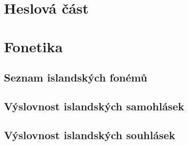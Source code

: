 \fi



\chapter{Heslová část}




\ifinputletters

\cleardoublepage

\dictionarygeometry
\pagestyle{myheadings}



\restoregeometry
\pagestyle{plain}

\fi



\ifinputphon

\cleardoublepage

\chapter{Fonetika}                               \label{sec:phon}

\section{Seznam islandských fonémů}              \label{sec:phon_phonems}
\clearpage

\section{Výslovnost islandských samohlásek}      \label{sec:phon_vowels}
\clearpage

\section{Výslovnost islandských souhlásek}       \label{sec:phon_consonants}

\fi


\ifinputmorpho

